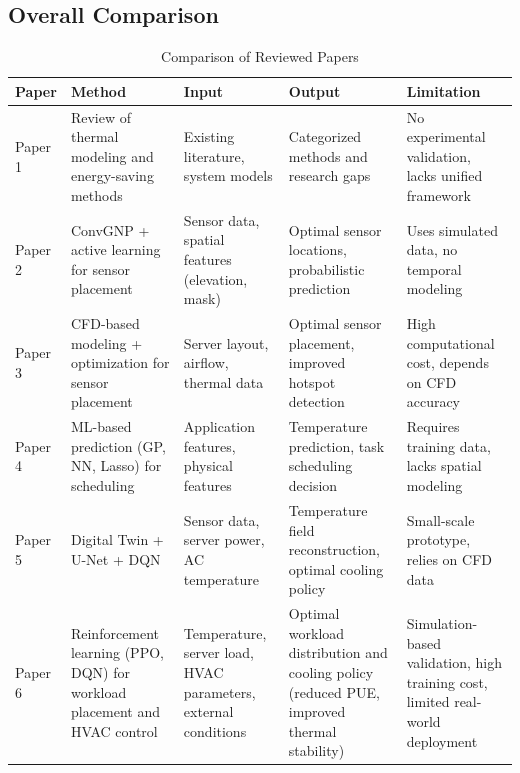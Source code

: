 \documentclass[12pt,a4paper]{article}
\begin{document}
    \subsection{Overall Comparison}
            \begin{table}[H]
                    \centering
                    \small
                    \caption{Comparison of Reviewed Papers}
                        \begin{tabular}{p{2cm} p{3cm} p{3cm} p{3cm} p{3cm}}
                        \toprule
                        Paper & Method & Input & Output & Limitation \\
                        \midrule
                        Paper 1 & Review of thermal modeling and energy-saving methods & Existing literature, system models & Categorized methods and research gaps & No experimental validation, lacks unified framework \\
                        
                        Paper 2 & ConvGNP + active learning for sensor placement & Sensor data, spatial features (elevation, mask) & Optimal sensor locations, probabilistic prediction & Uses simulated data, no temporal modeling \\
                        
                        Paper 3 & CFD-based modeling + optimization for sensor placement & Server layout, airflow, thermal data & Optimal sensor placement, improved hotspot detection & High computational cost, depends on CFD accuracy \\
                        
                        Paper 4 & ML-based prediction (GP, NN, Lasso) for scheduling & Application features, physical features & Temperature prediction, task scheduling decision & Requires training data, lacks spatial modeling \\
                        
                        Paper 5 & Digital Twin + U-Net + DQN & Sensor data, server power, AC temperature & Temperature field reconstruction, optimal cooling policy & Small-scale prototype, relies on CFD data \\
                        
                        Paper 6 & Reinforcement learning (PPO, DQN) for workload placement and HVAC control & Temperature, server load, HVAC parameters, external conditions & Optimal workload distribution and cooling policy (reduced PUE, improved thermal stability) & Simulation-based validation, high training cost, limited real-world deployment \\
                        

\end{tabular}
\end{table}
\end{document}
